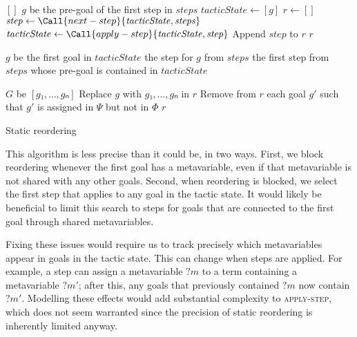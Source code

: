 \documentclass[sigplan,10pt,anonymous,review]{acmart}
\newcommand{\mvar}[1]{{?#1}}
\newlength{\cindentlen}
\newcommand{\cindent}{\hspace{\cindentlen}}
\begin{document}
\begin{algorithm}
  \begin{algorithmic}
        \State \Return $[]$
      \EndIf
      \State \Let $g$ be the pre-goal of the first step in $\mathit{steps}$
      \State $\mathit{tacticState} \gets [g]$
      \State $r \gets []$
        \State $\mathit{step} \gets \Call{next-step}{\mathit{tacticState}, \mathit{steps}}$
        \State $\mathit{tacticState} \gets \Call{apply-step}{\mathit{tacticState}, \mathit{step}}$
        \State Append $\mathit{step}$ to $r$
      \EndWhile
      \State \Return $r$
    \EndFunction

    \medskip

      \State \Let $g$ be the first goal in $\mathit{tacticState}$
        \State \Return the step for $g$ from $\mathit{steps}$
      \Else
        \State \Return the first step from $\mathit{steps}$ whose pre-goal is
        \State \hspace{\widthof{\Return}} \cindent contained in $\mathit{tacticState}$
      \EndIf
    \EndFunction

    \medskip

      \State \Let $G$ be $[g₁, \dots, gₙ]$
      \State Replace $g$ with $g₁, \dots, gₙ$ in $r$
      \State Remove from $r$ each goal $g'$ such that $g'$ is assigned in
      \State \cindent $Ψ$ but not in $Φ$
      \State \Return $r$
    \EndFunction
  \end{algorithmic}
  \caption{Static reordering}\label{alg:static-reordering}
\end{algorithm}

This algorithm is less precise than it could be, in two ways.
First, we block reordering whenever the first goal has a metavariable, even if that metavariable is not shared with any other goals.
Second, when reordering is blocked, we select the first step that applies to any goal in the tactic state.
It would likely be beneficial to limit this search to steps for goals that are connected to the first goal through shared metavariables.

Fixing these issues would require us to track precisely which metavariables appear in goals in the tactic state.
This can change when steps are applied.
For example, a step can assign a metavariable $\mvar{m}$ to a term containing a metavariable $\mvar{m'}$; after this, any goals that previously contained $\mvar{m}$ now contain $\mvar{m'}$.
Modelling these effects would add substantial complexity to \textsc{apply-step}, which does not seem warranted since the precision of static reordering is inherently limited anyway.
\end{document}
